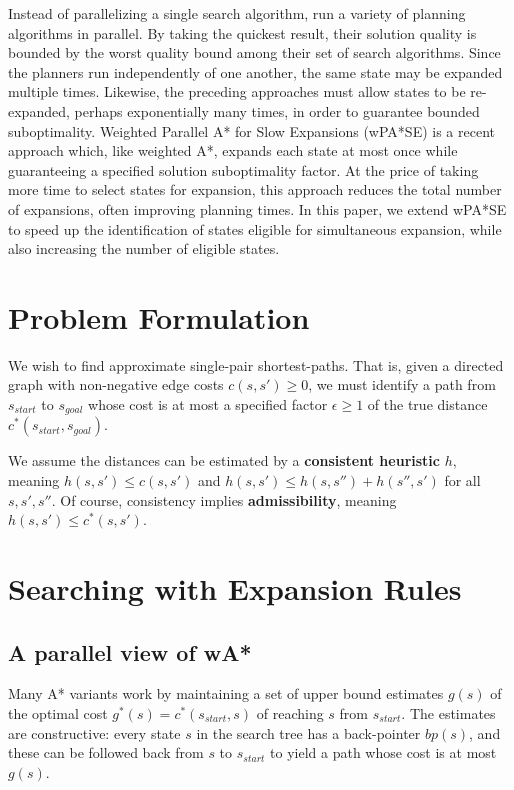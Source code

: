 \documentclass[letterpaper]{article}
\begin{document}
Instead of parallelizing a single search algorithm, \cite{valenzano10} run a variety of planning algorithms in parallel.
By taking the quickest result, their solution quality is bounded by the worst quality bound among their set of search algorithms. Since the planners run independently of one another, the same state may be expanded multiple times.
Likewise, the preceding approaches must allow states to be re-expanded, perhaps exponentially many times, in order to guarantee bounded suboptimality. Weighted Parallel A* for Slow Expansions (wPA*SE) \cite{phillips2014pa}
is a recent approach which, like weighted A*, expands each state at most once
while guaranteeing a specified solution suboptimality factor. At the price of taking more time to select states for expansion, this approach reduces the total number of expansions, often improving planning times.
In this paper, we extend wPA*SE to speed up the identification of states eligible for simultaneous expansion, while also increasing the number of eligible states.

\section{Problem Formulation}

We wish to find approximate single-pair shortest-paths. That is, given a directed graph with non-negative edge costs $c(s,s') \ge 0$, we must identify a path from $s_{start}$ to $s_{goal}$ whose cost is at most a specified factor $\epsilon\ge 1$ of the true distance $c^*(s_{start},s_{goal})$.

We assume the distances can be estimated by a \textbf{consistent heuristic} $h$, meaning $h(s,s')\le c(s,s')$ and $h(s,s')\le h(s,s'') + h(s'',s')$ for all $s,s',s''$. Of course, consistency implies \textbf{admissibility}, meaning $h(s,s')\le c^*(s,s')$.

\section{Searching with Expansion Rules}

\subsection{A parallel view of wA*}

Many A* variants work by maintaining a set of upper bound estimates $g(s)$ of the optimal cost $g^*(s) = c^*(s_{start},s)$ of reaching $s$ from $s_{start}$. The estimates are constructive: every state $s$ in the search tree has a back-pointer $bp(s)$, and these can be followed back from $s$ to $s_{start}$ to yield a path whose cost is at most $g(s)$.
\end{document}
